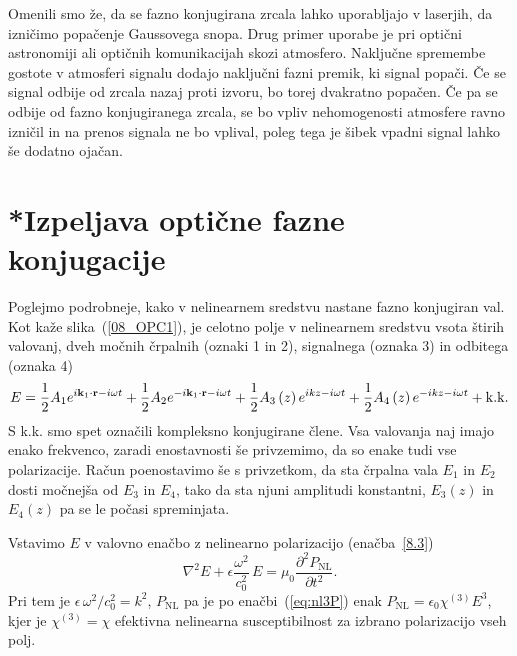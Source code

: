 \begin{remark}
Omenili smo že, da se fazno konjugirana zrcala lahko uporabljajo v laserjih, da
izničimo popačenje Gaussovega snopa. Drug primer uporabe je pri optični astronomiji
ali optičnih komunikacijah skozi atmosfero. Naključne spremembe gostote v atmosferi
signalu dodajo naključni fazni premik, ki signal popači. Če se signal odbije od zrcala nazaj
proti izvoru, bo torej dvakratno popačen. Če pa se odbije od fazno konjugiranega zrcala, 
se bo vpliv nehomogenosti atmosfere ravno izničil in na prenos signala ne bo vplival, poleg
tega je šibek vpadni signal lahko še dodatno ojačan. 
\end{remark}

\section{*Izpeljava optične fazne konjugacije}
Poglejmo podrobneje, kako v nelinearnem sredstvu nastane fazno konjugiran
val. Kot kaže slika~(\ref{08_OPC1}), je celotno polje v nelinearnem
sredstvu vsota štirih valovanj, dveh močnih črpalnih (oznaki 1 in 2), signalnega 
(oznaka 3) in odbitega (oznaka 4)
\begin{equation}
E=\frac{1}{2}A_{1}e^{i{\bf k}_{1}\cdot{\bf r}-i\omega t}+\frac{1}{2}A_{2}e^{-i{\bf k}_{1}\cdot{\bf r}-
i\omega t}+\frac{1}{2}A_{3}\left(z\right)e^{ikz-i\omega t}+\frac{1}{2}A_{4}
\left(z\right)e^{-ikz-i\omega t}+{\rm k.k.}
\label{8.99}
\end{equation}
S k.k. smo spet označili kompleksno konjugirane člene.  Vsa valovanja naj imajo
enako frekvenco, zaradi enostavnosti še privzemimo, da so enake tudi vse polarizacije.
Račun poenostavimo še s privzetkom, da sta črpalna vala $E_{1}$
in $E_{2}$ dosti močnejša od $E_{3}$ in $E_{4}$, tako da sta njuni
amplitudi konstantni, $E_{3}\left(z\right)$ in $E_{4}\left(z\right)$
pa se le počasi spreminjata.

Vstavimo $E$ v valovno enačbo z nelinearno polarizacijo (enačba~\ref{8.3})
\begin{equation}
\nabla^{2}E+\epsilon\frac{\omega^{2}}{c_0^{2}}\, 
E=\mu_{0}\frac{\partial^2 P_{\mathrm{NL}}}{\partial t^2}.
\label{8.100}
\end{equation}
Pri tem je $\epsilon\,\omega^{2}/c_0^{2}=k^{2}$, $P_{\textrm{NL}}$ pa je po enačbi~(\ref{eq:nl3P})
enak $P_\mathrm{NL}= \epsilon_{0}\chi^{(3)}E^3$, kjer je $\chi^{(3)} = \chi$
efektivna nelinearna susceptibilnost
za izbrano polarizacijo vseh polj. 

